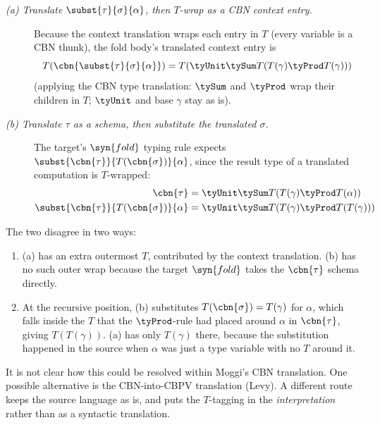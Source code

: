 \begin{description}
\item[\normalfont\textit{(a) Translate $\subst{\tau}{\sigma}{\alpha}$, then $T$-wrap as a CBN context entry.}]
Because the context translation wraps each entry in $T$ (every variable is a CBN thunk),
the fold body's translated context entry is
\[
T(\cbn{\subst{\tau}{\sigma}{\alpha}}) = T(\tyUnit \tySum T(T(\gamma) \tyProd T(\gamma)))
\]
(applying the CBN type translation: $\tySum$ and $\tyProd$ wrap their children in $T$; $\tyUnit$
and base $\gamma$ stay as is).
\item[\normalfont\textit{(b) Translate $\tau$ as a schema, then substitute the translated $\sigma$.}] The target's
$\syn{fold}$ typing rule expects $\subst{\cbn{\tau}}{T(\cbn{\sigma})}{\alpha}$, since the result
type of a translated computation is $T$-wrapped:
\begin{align*}
\cbn{\tau}                                       & = \tyUnit \tySum T(T(\gamma) \tyProd T(\alpha)) \\
\subst{\cbn{\tau}}{T(\cbn{\sigma})}{\alpha} & = \tyUnit \tySum T(T(\gamma) \tyProd T(T(\gamma)))
\end{align*}
\end{description}

\noindent The two disagree in two ways:

\begin{enumerate}
\item (a) has an extra outermost $T$, contributed by the context translation. (b) has no such
outer wrap because the target $\syn{fold}$ takes the $\cbn{\tau}$ schema directly.

\item At the recursive position, (b) substitutes $T(\cbn{\sigma}) = T(\gamma)$ for $\alpha$,
which falls inside the $T$ that the $\tyProd$-rule had placed around $\alpha$ in $\cbn{\tau}$,
giving $T(T(\gamma))$. (a) has only $T(\gamma)$ there, because the substitution happened in the
source when $\alpha$ was just a type variable with no $T$ around it.
\end{enumerate}

It is not clear how this could be resolved within Moggi's CBN translation. One possible
alternative is the CBN-into-CBPV translation (Levy). A different route keeps the source language as
is, and puts the $T$-tagging in the \emph{interpretation} rather than as a syntactic translation.

